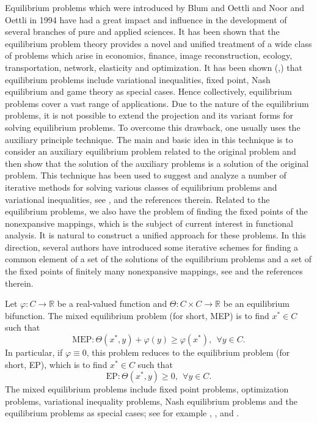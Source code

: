 \documentclass[reqno,b5paper]{amsart}
\theoremstyle{plain}
\theoremstyle{definition}
\numberwithin{equation}{section}
\numberwithin{equation}{section}
\begin{document}
Equilibrium problems which were introduced by Blum and Oettli \cite{blu} and Noor and Oettli \cite{asl} in 1994 have had a great
impact and influence in the development of several branches of pure and applied sciences. It has been shown that the
equilibrium problem theory provides a novel and unified treatment of a wide class of problems which arise in economics,
finance, image reconstruction, ecology, transportation, network, elasticity and optimization. It has been shown (\cite{blu},\cite{asl}) that
equilibrium problems include variational inequalities, fixed point, Nash equilibrium and game theory as special cases. Hence
collectively, equilibrium problems cover a vast range of applications. Due to the nature of the equilibrium problems, it is
not possible to extend the projection and its variant forms for solving equilibrium problems. To overcome this drawback,
one usually uses the auxiliary principle technique. The main and basic idea in this technique is to consider an auxiliary
equilibrium problem related to the original problem and then show that the solution of the auxiliary problems is a solution
of the original problem. This technique has been used to suggest and analyze a number of iterative methods for solving
various classes of equilibrium problems and variational inequalities, see \cite{asl2}, \cite{cen}  and the references therein.
Related to the equilibrium problems, we also have the problem of finding the fixed points of the nonexpansive mappings,
which is the subject of current interest in functional analysis. It is natural to construct a unified approach for these problems.
In this direction, several authors have introduced some iterative schemes for finding a common element of a set of the
solutions of the equilibrium problems and a set of the fixed points of finitely many nonexpansive mappings, see \cite{yao} and the references therein.

Let $\varphi :C\to \mathbb{R}$ be a real-valued function and $\Theta: C\times C\to \mathbb{R}$ be an equilibrium bifunction. The mixed equilibrium problem (for short, MEP) is to find $x^{*}\in C$ such that
$$\text{MEP}: \Theta (x^{*},y)+\varphi(y)\geq \varphi(x^{*}), \ \ \forall y\in C.$$
In particular, if $\varphi \equiv 0$, this problem reduces to the equilibrium problem (for short, EP), which is to find $x^{*}\in C$ such that 
$$\text{EP}: \Theta (x^{*}, y)\geq 0, \ \ \forall y\in C.$$
The mixed equilibrium problems include fixed point problems, optimization problems, variational inequality problems, Nash equilibrium problems and the equilibrium problems as special cases; see for example \cite{blu}, \cite{cha},\cite{cha2} and \cite{kon}.
\end{document}
